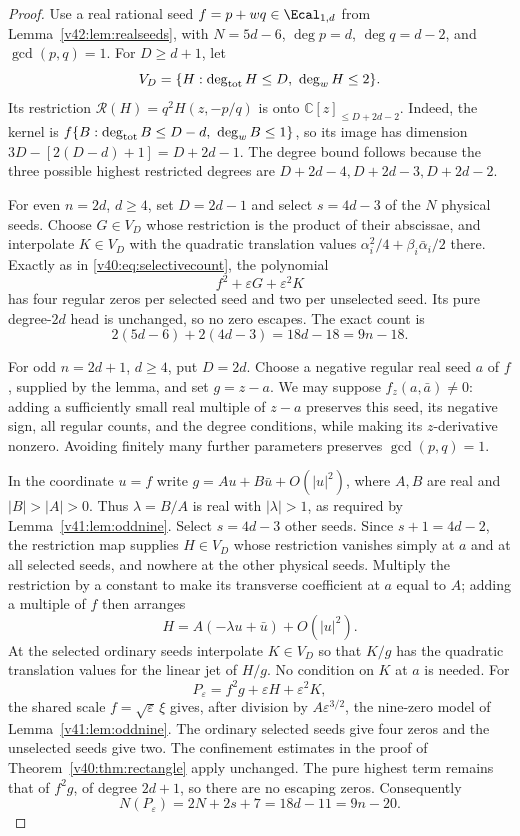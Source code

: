 \documentclass[UTF8,11pt]{ctexart}
\theoremstyle{definition}
\numberwithin{equation}{section}
\begin{document}
\begin{proof}
Use a real rational seed $f=p+wq\in\Ecal_{1,d}$ from
Lemma~\ref{v42:lem:realseeds}, with $N=5d-6$,
$\deg p=d$, $\deg q=d-2$, and $\gcd(p,q)=1$.
For $D\ge d+1$, let
\[
 V_D=\{H:\deg_{\rm tot}H\le D,\ \deg_wH\le2\}.
\]
Its restriction $\mathcal R(H)=q^2H(z,-p/q)$ is onto
$\mathbb C[z]_{\le D+2d-2}$. Indeed, the kernel is
$f\{B:\deg_{\rm tot}B\le D-d,\ \deg_wB\le1\}$, so
its image has dimension $3D-[2(D-d)+1]=D+2d-1$.
The degree bound follows because the three possible highest
restricted degrees are $D+2d-4,D+2d-3,D+2d-2$.

For even $n=2d$, $d\ge4$, set $D=2d-1$ and select
$s=4d-3$ of the $N$ physical seeds. Choose $G\in V_D$
whose restriction is the product of their abscissae, and
interpolate $K\in V_D$ with the quadratic translation
values $\alpha_i^2/4+\beta_i\bar\alpha_i/2$ there.
Exactly as in \eqref{v40:eq:selectivecount}, the polynomial
\[
                      f^2+\varepsilon G+\varepsilon^2K
\]
has four regular zeros per selected seed and two per
unselected seed. Its pure degree-$2d$ head is unchanged,
so no zero escapes. The exact count is
\[
                 2(5d-6)+2(4d-3)=18d-18=9n-18.
\]

For odd $n=2d+1$, $d\ge4$, put $D=2d$. Choose a
negative regular real seed $a$ of $f$, supplied by the lemma,
and set $g=z-a$. We may suppose
$f_z(a,\bar a)\ne0$: adding a sufficiently small real multiple
of $z-a$ preserves this seed, its negative sign, all regular
counts, and the degree conditions, while making its
$z$-derivative nonzero. Avoiding finitely many further
parameters preserves $\gcd(p,q)=1$.

In the coordinate $u=f$ write
$g=A u+B\bar u+O(|u|^2)$, where $A,B$ are real and
$|B|>|A|>0$. Thus $\lambda=B/A$ is real with
$|\lambda|>1$, as required by Lemma~\ref{v41:lem:oddnine}.
Select $s=4d-3$ other seeds. Since $s+1=4d-2$, the
restriction map supplies $H\in V_D$ whose restriction
vanishes simply at $a$ and at all selected seeds, and
nowhere at the other physical seeds. Multiply the restriction
by a constant to make its transverse coefficient at $a$
equal to $A$; adding a multiple of $f$ then arranges
\[
                         H=A(-\lambda u+\bar u)+O(|u|^2).
\]
At the selected ordinary seeds interpolate $K\in V_D$
so that $K/g$ has the quadratic translation values for
the linear jet of $H/g$. No condition on $K$ at $a$ is
needed. For
\[
                         P_\varepsilon=f^2g+
                                      \varepsilon H+\varepsilon^2K,
\]
the shared scale $f=\sqrt\varepsilon\,\xi$ gives, after
division by $A\varepsilon^{3/2}$, the nine-zero model
of Lemma~\ref{v41:lem:oddnine}. The ordinary selected
seeds give four zeros and the unselected seeds give two.
The confinement estimates in the proof of
Theorem~\ref{v40:thm:rectangle} apply unchanged.
The pure highest term remains that of $f^2g$, of degree
$2d+1$, so there are no escaping zeros. Consequently
\[
                N(P_\varepsilon)=2N+2s+7
                                =18d-11=9n-20.
\]


\end{proof}
\end{document}
